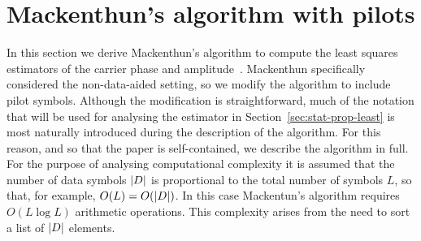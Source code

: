 \documentclass[journal]{IEEEtran}
\begin{document}
\section{Mackenthun's algorithm with pilots}\label{sec:least-squar-estim}

In this section we derive Mackenthun's algorithm to compute the least squares estimators of the carrier phase and amplitude~\cite{Mackenthun1994}.  Mackenthun specifically considered the non-data-aided setting, so we modify the algorithm to include pilot symbols.  Although the modification is straightforward, much of the notation that will be used for analysing the estimator in Section~\ref{sec:stat-prop-least} is most naturally introduced during the description of the algorithm.  For this reason, and so that the paper is self-contained, we describe the algorithm in full.  For the purpose of analysing computational complexity it is assumed that the number of data symbols ${\left\vert D \right\vert}$ is proportional to the total number of symbols $L$, so that, for example, $O(L) = O({\left\vert D \right\vert})$.  In this case Mackentun's algorithm requires $O(L \log L)$ arithmetic operations.  This complexity arises from the need to sort a list of ${\left\vert D \right\vert}$ elements.  

\end{document}
